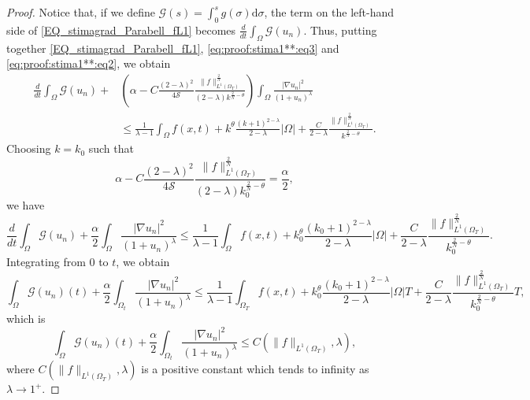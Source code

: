 \documentclass[10pt,a4paper]{amsart}
\newcommand{\abs}[1]{\left|#1\right|}
\def\elleomT#1{L^{#1}(\Omega_T)}
\def\io{\int_\Omega}
\def\ioT{\int_{\Omega_T}}
\def\iot{\int_{\Omega_t}}
\def\norma#1#2{ \|#1 \|_{#2}}
\begin{document}
\begin{proof}
    Notice that, if we define $\mathcal{G}(s)=\int_0^s g(\sigma)\mathrm{d}\sigma$, the term on the left-hand side of \eqref{EQ_stimagrad_Parabell_fL1} becomes $\frac{d}{dt}\io \mathcal{G}(u_n)$. Thus, putting together \eqref{EQ_stimagrad_Parabell_fL1}, \eqref{eq:proof:stima1**:eq3} and \eqref{eq:proof:stima1**:eq2}, we obtain
    \begin{equation}
    \begin{split}
    \frac{d}{dt}\io \mathcal{G}(u_n) +
    &\left(\alpha -C \frac{(2-\lambda)^2}{4\mathcal{S}}\frac{\norma{f}{\elleomT1}^{\frac{2}{N}}}{(2-\lambda) k^{\frac{2}{N}-\theta}}\right)
    \io \frac{\left|\nabla u_n\right|^2}{\left(1+u_n\right)^\lambda} \\
    & \leq 
    \frac{1}{\lambda-1}\io f(x,t) +
    k^{\theta}\frac{(k+1)^{2-\lambda}}{2-\lambda}\abs{\Omega}
    +\frac{C}{2-\lambda} \frac{\norma{f}{\elleomT 1} ^{\frac{2}{N}}}{k^{\frac{2}{N}-\theta}} .
    \end{split}
    \end{equation}
    Choosing $k=k_0$ such that 
    $$\alpha -C \frac{(2-\lambda)^2}{4\mathcal{S}}\frac{\norma{f}{\elleomT1}^{\frac{2}{N}}}{(2-\lambda) k_0^{\frac{2}{N}-\theta}}=\frac{\alpha}{2},$$
    we have
    $$\frac{d}{dt}\io \mathcal{G}(u_n) +
    \frac{\alpha}{2}\io \frac{\left|\nabla u_n\right|^2}{\left(1+u_n\right)^\lambda}
    \leq 
    \frac{1}{\lambda-1}\io f(x,t) +
    k_0^{\theta}\frac{(k_0+1)^{2-\lambda}}{2-\lambda}\abs{\Omega}
    +\frac{C}{2-\lambda} \frac{\norma{f}{\elleomT 1} ^{\frac{2}{N}}}{k_0^{\frac{2}{N}-\theta}} .
    $$
    Integrating from $0$ to $t$, we obtain
    $$\io \mathcal{G}(u_n)(t) +
    \frac{\alpha}{2}\iot \frac{\left|\nabla u_n\right|^2}{\left(1+u_n\right)^\lambda}
    \leq 
    \frac{1}{\lambda-1}\ioT f(x,t) +
    k_0^{\theta}\frac{(k_0+1)^{2-\lambda}}{2-\lambda}\abs{\Omega}T
    +\frac{C}{2-\lambda} \frac{\norma{f}{\elleomT 1} ^{\frac{2}{N}}}{k_0^{\frac{2}{N}-\theta}}T,
    $$
    which is
    \begin{equation}\label{eq:proof:stima1**:eq3.5}
        \io \mathcal{G}(u_n)(t) +
    \frac{\alpha}{2}\iot \frac{\left|\nabla u_n\right|^2}{\left(1+u_n\right)^\lambda}
    \leq C\left(\|f\|_{L^1(\Omega_T)}, \lambda\right),
    \end{equation}
    where $C\left(\|f\|_{L^1(\Omega_T)},\lambda\right)$ is a positive constant which tends to infinity as $\lambda\to1^+$.


\end{proof}
\end{document}
